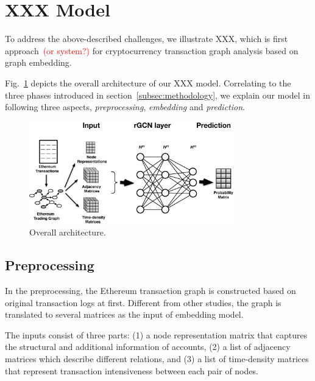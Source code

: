
\section{XXX Model}
To address the above-described challenges, we illustrate XXX, which is first approach~\textcolor{red}{(or system?)} for cryptocurrency transaction graph analysis based on graph embedding.

Fig.~\ref{fig:architecture} depicts the overall architecture of our XXX model. Correlating to the three phases introduced in section~\ref{subsec:methodology}, we explain our model in following three aspects, \emph{preprocessing}, \emph{embedding} and \emph{prediction}.

\begin{figure}[htbp]
	\centering
	\includegraphics[width=3.5in]{fig/architecture.eps}
	\caption{Overall architecture.}
	\label{fig:architecture}
\end{figure}


\subsection{Preprocessing}
\label{sec:input}
In the preprocessing, the Ethereum transaction graph is constructed based on original transaction logs at first. Different from other studies, the graph is translated to several matrices as the input of embedding model.

 The inputs consist of three parts: (1) a node representation matrix that captures the structural and additional information of accounts, (2) a list of adjacency matrices which describe different relations, and (3) a list of time-density matrices that represent transaction intensiveness between each pair of nodes.

